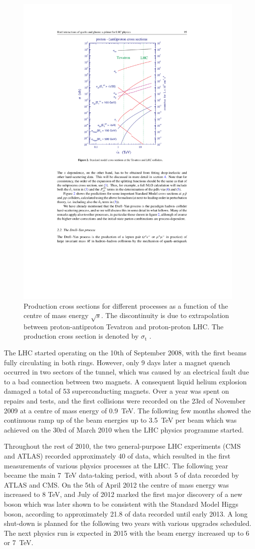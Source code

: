 \begin{figure}[!htbp]
  \centering
  \leavevmode
  \includegraphics[width=0.6\columnwidth]{production_cross_sections}
  \caption[Production cross sections for different processes as a function of the centre of mass energy.]{Production
  cross sections for different processes as a function of the centre of mass energy $\sqrt{s}$. The discontinuity is due
  to extrapolation between proton-antiproton Tevatron and proton-proton LHC. The \ttbar production cross section is
  denoted by $\sigma_\textrm{t}$ \autocite{primer_LHC}.}
  \label{fig:production_cross_sections}
\end{figure}

The LHC started operating on the 10th of September 2008, with the first beams fully circulating in both rings. However,
only 9 days later a magnet quench occurred in two sectors of the tunnel, which was caused by an electrical fault due to
a bad connection between two magnets. A consequent liquid helium explosion damaged a total of 53 superconducting
magnets. Over a year was spent on repairs and tests, and the first collisions were recorded on the 23rd of November 2009
at a centre of mass energy of \SI{0.9}{\TeV}. The following few months showed the continuous ramp up of the beam
energies up to \SI{3.5}{\TeV} per beam which was achieved on the 30rd of March 2010 when the LHC physics programme
started.

Throughout the rest of 2010, the two general-purpose LHC experiments (CMS and ATLAS) recorded approximately
\SI{40}{\invpb} of data, which resulted in the first measurements of various physics processes at the LHC. The following
year became the main \SI{7}{\TeV} data-taking period, with about \SI{5}{\invfb} of data recorded by ATLAS and CMS. On
the 5th of April 2012 the centre of mass energy was increased to 8 TeV, and July of 2012 marked the first major
discovery of a new boson which was later shown to be consistent with the Standard Model Higgs boson, according to
approximately \SI{21.8}{\invfb} of data recorded until early 2013. A long shut-down is planned for the following two
years with various upgrades scheduled. The next physics run is expected in 2015 with the beam energy increased up to 6
or \SI{7}{\TeV}.

